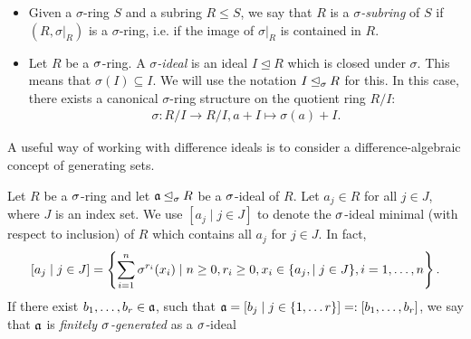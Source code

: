 \begin{defn} $\phantom{}$
\begin{itemize}
\item Given a $\sigma$-ring $S$ and a subring $R \leq S$, we say that $R$ is a $\sigma$\emph{-subring}  of $S$ if $(R,\sigma|_{R})$ is a $\sigma$-ring,
i.e.  if the image of $\sigma|_{R}$ is contained in $R$.
\item Let $R$ be a $\sigma$-ring. A $\sigma$\emph{-ideal}  is an ideal $I \unlhd R$ which is closed under $\sigma$. This means that $\sigma(I) \subseteq I$. We will use the notation $I \unlhd_{\sigma} R$ for this. In this case, there exists a canonical $\sigma$-ring structure on the quotient ring $R/I$:
\begin{align*} \sigma: R/I \rightarrow R/I, a + I \mapsto \sigma(a) + I. \end{align*}
\end{itemize}
\end{defn}

A useful way of working with difference ideals is to consider a difference-algebraic concept of generating sets.

\begin{defn}
Let $R$ be a $\sigma$-ring and let  $\mathfrak{a} \unlhd_{\sigma} R$ be a $\sigma$-ideal of $R$. Let $a_j \in R$ for all $ j \in J$, where $J$ is an index set. We use $[a_j \mid j \in J]$ to denote the $\sigma$-ideal minimal (with respect to inclusion) of $R$ which contains all $a_j$ for $j \in J$. In fact,  \[[a_j \mid j \in J] = \left\{ \sum_{i=1}^n \sigma^{r_i}(x_i) \mid n \geq 0, r_i \geq 0, x_i \in \{a_j, \mid j \in J \}, i=1,\ldots,n \right\}. \] 
If there exist $b_1,\ldots,b_r \in \mathfrak{a}$, such that $\mathfrak{a} = [b_j \mid j \in \{1,\ldots r \}] =: [b_1,\ldots,b_r]$,
 we say that $\mathfrak{a}$ is \emph{finitely $\sigma$-generated} as a $\sigma$-ideal 
\end{defn}

